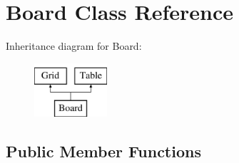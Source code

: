 \hypertarget{classBoard}{}\section{Board Class Reference}
\label{classBoard}
Inheritance diagram for Board\+:\begin{figure}[H]
\begin{center}
\leavevmode
\includegraphics[height=2.000000cm]{classBoard}
\end{center}
\end{figure}
\subsection*{Public Member Functions}
